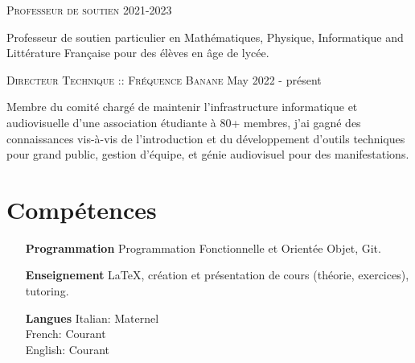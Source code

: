 \documentclass[11pt]{article}
\renewcommand{\line}[2]{{\vspace{4pt} \large \noindent\textsc{#1} \hfill #2}\vspace{4pt}}
\begin{document}
  \line{Professeur de soutien}{2021-2023}

  Professeur de soutien particulier en Mathématiques, Physique, Informatique and Littérature Française pour des élèves en âge de lycée.

  \line{Directeur Technique :: Fréquence Banane}{May 2022 - présent}

  Membre du comité chargé de maintenir l'infrastructure informatique et audiovisuelle d'une association étudiante à 80+ membres, j'ai gagné des connaissances vis-à-vis de l'introduction et du développement d'outils techniques pour grand public, gestion d'équipe, et génie audiovisuel pour des manifestations.

  \section*{Compétences}
  
  \begin{adjustwidth}{1in}{}
    \begin{itemize}
      \item[\textbf{Programmation}] Programmation Fonctionnelle et Orientée Objet, Git.
      \item[\textbf{Enseignement}] LaTeX, création et présentation de cours (théorie, exercices), tutoring.
      \item[\textbf{Langues}] Italian: Maternel \\ French: Courant \\ English: Courant
    \end{itemize}
  \end{adjustwidth}
\end{document}
